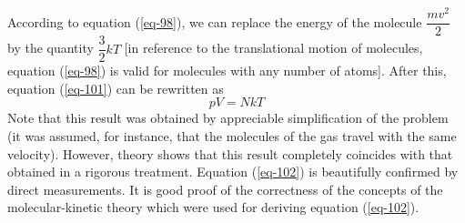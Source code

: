 \documentclass[a4paper,sfsidenotes]{tufte-book}
\begin{document}
According to equation (\ref{eq-98}), we can replace the energy of the molecule $\dfrac{mv^{2}}{2}$ by the quantity $\dfrac{3}{2} kT$ [in reference to the translational motion of molecules, equation (\ref{eq-98}) is valid for molecules with any number of atoms]. After this, equation (\ref{eq-101}) can be rewritten as
\begin{equation}%
pV=NkT
\label{eq-102}
\end{equation}
Note that this result was obtained by appreciable simplification of the problem (it was assumed, for instance, that the molecules of the gas travel with the same velocity). However, theory shows that this result completely coincides with that obtained in a rigorous treatment. Equation (\ref{eq-102}) is beautifully confirmed by direct measurements. It is good proof of the correctness of the concepts of the molecular-kinetic theory which were used for deriving equation (\ref{eq-102}).
\end{document}
